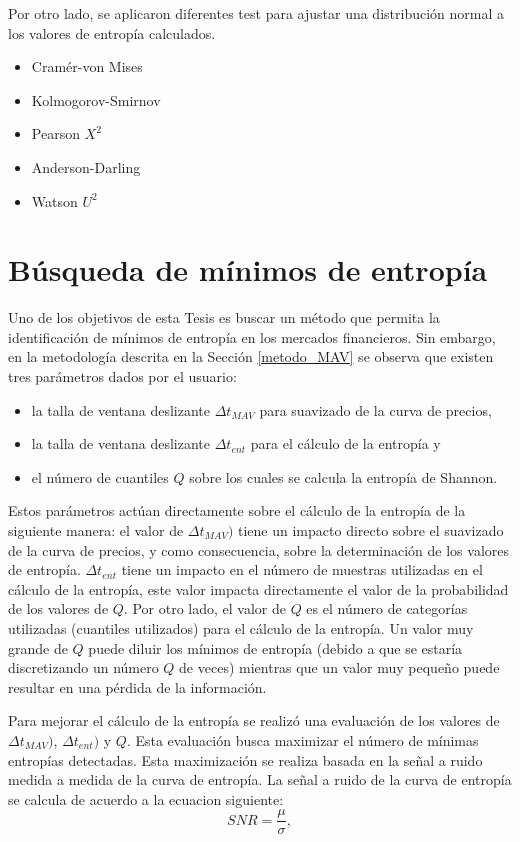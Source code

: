 Por otro lado, se aplicaron diferentes test para ajustar una distribución normal a los valores de entropía calculados.
\begin{itemize}
	\item Cramér-von Mises
	\item Kolmogorov-Smirnov
	\item Pearson $X^2$
	\item Anderson-Darling
	\item Watson $U^2$
\end{itemize}



\section{Búsqueda de mínimos de entropía}

Uno de los objetivos de esta Tesis es buscar un método que permita la identificación de mínimos de entropía en los mercados financieros.
Sin embargo, en la metodología descrita en la Sección \ref{metodo_MAV} se observa que existen tres parámetros dados por el usuario:
\begin{itemize}
	\item la talla de ventana deslizante $\Delta t_{MAV}$ para suavizado de la curva de precios,
	\item la talla de ventana deslizante $\Delta t_{ent}$ para el cálculo de la entropía y
	\item el número de cuantiles $Q$ sobre los cuales se calcula la entropía de Shannon.
\end{itemize}

Estos parámetros actúan directamente sobre el cálculo de la entropía de la siguiente manera: 
el valor de $\Delta t_{MAV})$ tiene un impacto directo sobre el suavizado de la curva de precios, y como consecuencia, sobre la determinación de los valores de entropía. 
$\Delta t_{ent}$ tiene un impacto en el número de muestras utilizadas en el cálculo de la entropía, este valor impacta directamente el valor de la probabilidad de los valores de $Q$. 
Por otro lado, el valor de $Q$ es el número de categorías utilizadas (cuantiles utilizados) para el cálculo de la entropía. 
Un valor muy grande de $Q$ puede diluir los mínimos de entropía (debido a que se estaría discretizando un número $Q$ de veces) mientras que un valor muy pequeño puede resultar en una pérdida de la información.

Para mejorar el cálculo de la entropía se realizó una evaluación de los valores de $\Delta t_{MAV})$, $\Delta t_{ent})$ y $Q$.
Esta evaluación busca maximizar el número de mínimas entropías detectadas.
Esta maximización se realiza basada en la señal a ruido medida a medida de la curva de entropía.
La señal a ruido de la curva de entropía se calcula de acuerdo a la ecuacion siguiente:
 \begin{equation}
SNR= \frac{\mu}{\sigma},
\end{equation}

